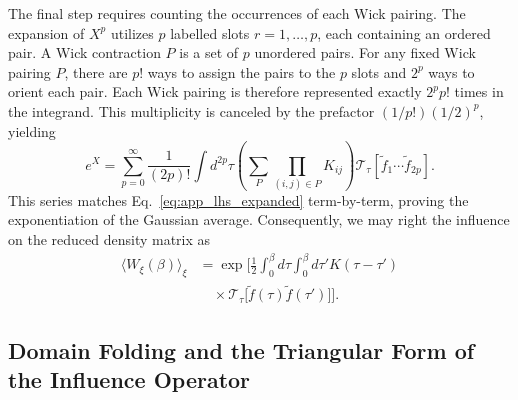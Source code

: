 The final step requires counting the occurrences of each Wick pairing. The expansion of $X^p$ utilizes $p$ labelled slots $r=1, \dots, p$, each containing an ordered pair. A Wick contraction $P$ is a set of $p$ unordered pairs. For any fixed Wick pairing $P$, there are $p!$ ways to assign the pairs to the $p$ slots and $2^p$ ways to orient each pair. Each Wick pairing is therefore represented exactly $2^p p!$ times in the integrand. This multiplicity is canceled by the prefactor $(1/p!) (1/2)^p$, yielding
\begin{equation}
    e^X = \sum_{p=0}^\infty \frac{1}{(2p)!} \int d^{2p}\tau \left( \sum_P \prod_{(i,j) \in P} K_{ij} \right) \mathcal{T}_\tau \left[ \tilde{f}_1 \cdots \tilde{f}_{2p} \right].
\end{equation}
This series matches Eq.~\eqref{eq:app_lhs_expanded} term-by-term, proving the exponentiation of the Gaussian average. Consequently, we may right the influence on the reduced density matrix as
\begin{equation}
    \begin{split}
        \langle W_\xi(\beta)\rangle_\xi &= \exp\bigg[\frac12\int_0^\beta d\tau\int_0^\beta d\tau' K(\tau-\tau') \\
        &\quad \times \mathcal T_\tau\!\big[\tilde f(\tau)\tilde f(\tau')\big]\bigg].
    \end{split}
    \label{eq:Wbar_cumulant_T}
\end{equation}

\subsection*{Domain Folding and the Triangular Form of the Influence Operator}
\label{app:triangular_folding}

